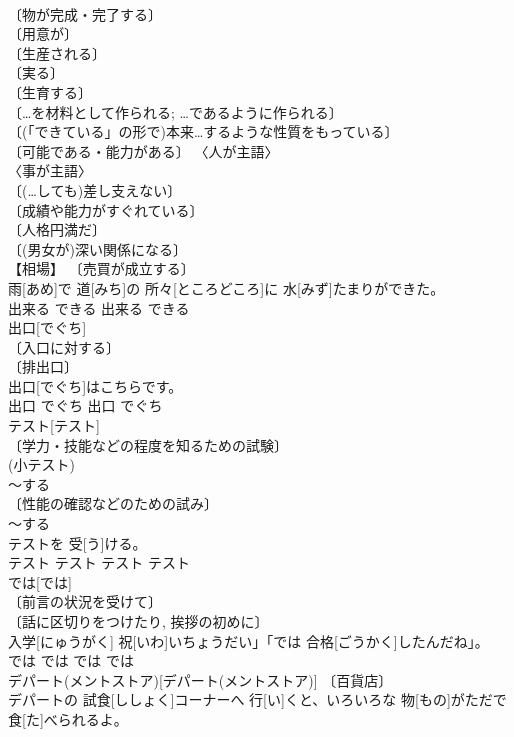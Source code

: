 \documentclass[8pt]{extreport}
\begin{document}
\begin{CJK}{UTF8}{min}
\\	〔物が完成・完了する〕 
\\	〔用意が〕 
\\	〔生産される〕 
\\	〔実る〕 
\\	〔生育する〕 
\\	〔…を材料として作られる; …であるように作られる〕 
\\	〔(「できている」の形で)本来…するような性質をもっている〕 
\\	〔可能である・能力がある〕 〈人が主語〉 
\\	〈事が主語〉 
\\	〔(…しても)差し支えない〕 
\\	〔成績や能力がすぐれている〕 
\\	〔人格円満だ〕 
\\	〔(男女が)深い関係になる〕 
\\	【相場】 〔売買が成立する〕 
\\	雨[あめ]で 道[みち]の 所々[ところどころ]に 水[みず]たまりができた。	
\\	出来る	できる	出来る	できる	
\\	出口[でぐち]	
\\	〔入口に対する〕 
\\	〔排出口〕 
\\	出口[でぐち]はこちらです。	
\\	出口	でぐち	出口	でぐち	
\\	テスト[テスト]	
\\	〔学力・技能などの程度を知るための試験〕 
\\	(小テスト) 
\\	[⇒しけん３] ～する 
\\	〔性能の確認などのための試み〕 
\\	～する 
\\	テストを 受[う]ける。	
\\	テスト	テスト	テスト	テスト	
\\	では[では]	
\\	〔前言の状況を受けて〕 
\\	〔話に区切りをつけたり, 挨拶の初めに〕 
\\	入学[にゅうがく] 祝[いわ]いちょうだい」「では 合格[ごうかく]したんだね」。	
\\	では	では	では	では	
\\	デパート(メントストア)[デパート(メントストア)]	〔百貨店〕 
\\	デパートの 試食[ししょく]コーナーへ 行[い]くと、いろいろな 物[もの]がただで 食[た]べられるよ。	

\end{CJK}
\end{document}
